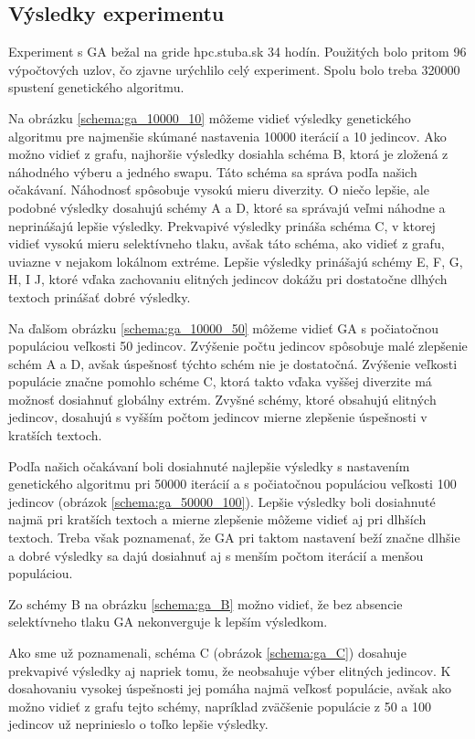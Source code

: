 \subsection{Výsledky experimentu}
Experiment s GA bežal na gride hpc.stuba.sk 34 hodín.
Použitých bolo pritom 96 výpočtových uzlov, čo zjavne urýchlilo celý experiment.
Spolu bolo treba 320000 spustení genetického algoritmu.

Na obrázku \ref{schema:ga_10000_10} môžeme vidieť výsledky genetického algoritmu pre najmenšie skúmané nastavenia 10000 iterácií a 10 jedincov.
Ako možno vidieť z grafu, najhoršie výsledky dosiahla schéma B, ktorá je zložená z náhodného výberu a jedného swapu. Táto schéma sa správa podľa našich očakávaní. Náhodnosť spôsobuje vysokú mieru diverzity.
O niečo lepšie, ale podobné výsledky dosahujú schémy A a D, ktoré sa správajú veľmi náhodne a neprinášajú lepšie výsledky.
Prekvapivé výsledky prináša schéma C, v ktorej vidieť vysokú mieru selektívneho tlaku, avšak táto schéma, ako vidieť z grafu, uviazne v nejakom lokálnom extréme.
Lepšie výsledky prinášajú schémy E, F, G, H, I J, ktoré vďaka zachovaniu elitných jedincov dokážu pri dostatočne dlhých textoch prinášať dobré výsledky.


Na ďalšom obrázku \ref{schema:ga_10000_50} môžeme vidieť GA s počiatočnou populáciou veľkosti 50 jedincov. Zvýšenie počtu jedincov spôsobuje malé zlepšenie  schém A a D, avšak úspešnosť týchto schém nie je dostatočná. Zvýšenie veľkosti populácie značne pomohlo schéme C, ktorá takto vďaka vyššej diverzite má možnosť dosiahnuť globálny extrém. Zvyšné schémy, ktoré obsahujú elitných jedincov, dosahujú s vyšším počtom jedincov mierne zlepšenie úspešnosti v kratších textoch.


Podľa našich očakávaní boli dosiahnuté najlepšie výsledky s nastavením genetického algoritmu pri 50000 iterácií a s počiatočnou populáciou veľkosti 100 jedincov (obrázok \ref{schema:ga_50000_100}). Lepšie výsledky boli dosiahnuté najmä pri kratších textoch a mierne zlepšenie môžeme vidieť aj pri dlhších textoch. Treba však poznamenať, že GA pri taktom nastavení beží značne dlhšie a dobré výsledky sa dajú dosiahnuť aj s menším počtom iterácií a menšou populáciou. 


Zo schémy B na obrázku \ref{schema:ga_B} možno vidieť, že bez absencie selektívneho tlaku GA nekonverguje k lepším výsledkom.


Ako sme už poznamenali, schéma C (obrázok \ref{schema:ga_C}) dosahuje prekvapivé výsledky aj napriek tomu, že neobsahuje výber elitných jedincov. K dosahovaniu vysokej úspešnosti jej pomáha najmä veľkosť populácie, avšak ako možno vidieť z grafu tejto schémy, napríklad zväčšenie populácie z 50 a 100 jedincov už neprinieslo o toľko lepšie výsledky.


